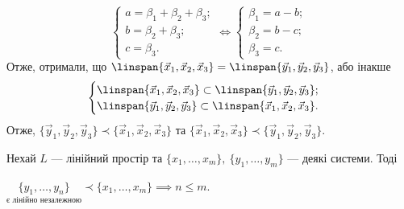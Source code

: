 \documentclass{math_library}
\begin{document}
\begin{example}
\[\begin{cases}
	a = \beta_1 + \beta_2 + \beta_3; \\
	b = \beta_2 + \beta_3; \\
	c = \beta_3.
	\end{cases} \iff
	\begin{cases}
	\beta_1 = a -b; \\
	\beta_2 = b - c; \\
	\beta_3 = c.
	\end{cases}
\]
	Отже, отримали, що $\linspan \{\vec{x}_1,\vec{x}_2,\vec{x}_3\} = \linspan  \{\vec{y}_1,\vec{y}_2,\vec{y}_3\}$, або інакше 
	\[
	\begin{cases} \linspan \{\vec{x}_1,\vec{x}_2,\vec{x}_3\} \subset \linspan \{\vec{y}_1,\vec{y}_2,\vec{y}_3\}; \\ \linspan \{\vec{y}_1,\vec{y}_2,\vec{y}_3\} \subset \linspan \{\vec{x}_1,\vec{x}_2,\vec{x}_3\}. \end{cases}
	\]
	Отже, $\{\vec{y}_1, \vec{y}_2, \vec{y}_3\} \prec \{\vec{x}_1, \vec{x}_2, \vec{x}_3\}$ та $\{\vec{x}_1, \vec{x}_2, \vec{x}_3\} \prec \{\vec{y}_1, \vec{y}_2, \vec{y}_3\}$.
	\end{example}
	
	\begin{theorem}
	\label{n_leq_m}
	Нехай $L$ --- лінійний простір та $\{x_1,\dots,x_m\},\ \{y_1,\dots,y_m\}$ --- деякі системи. Тоді
	\begin{center}
	$\underset{\textrm{є лінійно незалежною}}{\{y_1, \dots, y_n \}} \prec \{x_1, \dots, x_m \} \implies n \leq m$.
	\end{center}
	\end{theorem}
	
\end{document}
